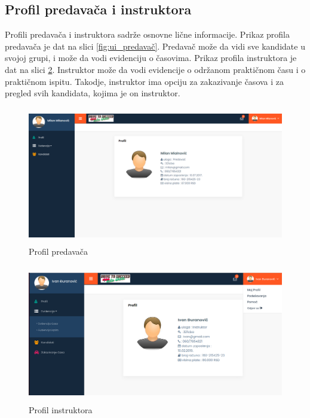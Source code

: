 \subsection{Profil predavača i instruktora}

Profili predavača i instruktora sadrže osnovne lične informacije. Prikaz profila predavača je dat na slici \ref{fig:ui_predavač}. Predavač može da vidi sve kandidate u svojoj grupi, i može da vodi evidenciju o časovima. Prikaz profila instruktora je dat na slici \ref{fig:ui_instruktor}. Instruktor može da vodi evidencije o održanom praktičnom času i o praktičnom ispitu. Takodje, instruktor ima opciju za zakazivanje časova i za pregled svih kandidata, kojima je on instruktor.

\begin{figure}[H]
  \begin{center}
      \includegraphics[width=140mm, height=60mm]{UI/UI_Predavac.png}
  \end{center}
  \caption {Profil predavača}
  \label{fig:predavač}

\end{figure}

\begin{figure}[H]
  \begin{center}
      \includegraphics[width=140mm, height=60mm]{UI/UI_profil_instruktora.png}
  \end{center}
  \caption {Profil instruktora}
  \label{fig:ui_instruktor}

\end{figure}
